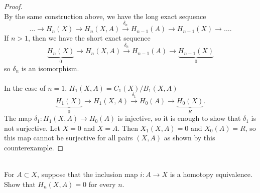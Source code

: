 \documentclass{article}
\newenvironment{problem}[2][Problem]{\begin{trivlist}
\item[\hskip \labelsep {\bfseries #1}\hskip \labelsep {\bfseries #2.}]}{\end{trivlist}}
\newcommand{\fn}[3]{#1 \colon #2 \rightarrow #3}
\newcommand{\ra}{\rightarrow}
\begin{document}
\begin{proof} \text{} \\
  By the same construction above, we have the long exact sequence \[
    \hdots \ra H_n(X) \ra H_n(X,A) \xrightarrow{\delta_n} H_{n-1}(A) \ra H_{n-1}(X) \ra \hdots.
  \] If $n > 1$, then we have the short exact sequence \[
    \underbrace{H_n(X)}_0 \ra H_n(X,A) \xrightarrow{\delta_n} H_{n-1}(A) \ra \underbrace{H_{n-1}(X)}_0
  \] so $\delta_n$ is an isomorphism.
  \\~\\
  In the case of $n=1$, $H_1(X,A) = C_1(X)/B_1(X,A)$
  \[
    \underbrace{H_1(X)}_0 \ra H_1(X,A) \xrightarrow{\delta_1} H_0(A) \ra \underbrace{H_0(X)}_R.
  \]
  The map $\fn{\delta_1}{H_1(X, A)}{H_0(A)}$ is injective, so it is
  enough to show that $\delta_1$ is not surjective.
  Let $X = {0}$ and $X = A$. Then $X_1(X, A) = 0$ and $X_0(A) = R$, so this map
  cannot be surjective for all pairs $(X, A)$ as shown by this counterexample.
\end{proof}
\pagebreak
\begin{problem}{3} \text{} \\
  For $A \subset X$, suppose that the inclusion map $\fn iAX$ is a homotopy
  equivalence. Show that $H_n(X, A) = 0$ for every $n$.
\end{problem}
\end{document}

